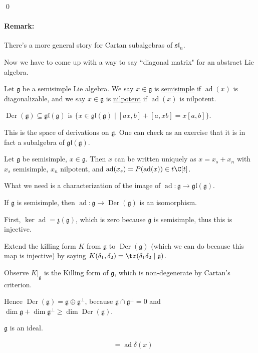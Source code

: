 \documentclass[x11names,reqno,14pt]{extarticle}
\newcommand{\mk}[1]{\mathfrak{#1}}
\newcommand{\g}{\mk{g}}
\DeclareMathOperator{\ad}{ad}
\DeclareMathOperator{\Der}{Der}
\newcommand{\gl}{\mk{g}\mk{l}}
\renewcommand{\sl}{\mk{s}\mk{l}}
\begin{document}
\qed

\paragraph{Remark:} There's a more general story for Cartan subalgebras of $\sl_n$. 

Now we have to come up with a way to say ``diagonal matrix" for an abstract Lie algebra. 


Let $\g$ be a semisimple Lie algebra. We say $x \in \g$ is \underline{semisimple} if $\ad(x)$ is diagonalizable, and we say $x \in \g$ is \underline{nilpotent} if $\ad(x)$ is nilpotent. 


$\Der(\g) \subseteq \gl(\g)$ is $\{x\in\gl(\g) \mid [ax, b] + [a, xb] = x[a,b]\}$.

This is the space of derivations on $\g$. One can check as an exercise that it is in fact a subalgebra of $\gl(\g)$. 

\thm

Let $\g$ be semisimple, $x \in \g$. Then $x$ can be written uniquely as $x = x_s + x_n$ with $x_s$ semisimple, $x_n$ nilpotent, and $\ad(x_s) = P(\ad(x)) \in t\C[t]$. 

\proof

What we need is a characterization of the image of $\ad:\g\to\gl(\g)$.

\prop

If $\g$ is semisimple, then $\ad:\g\to\Der(\g)$ is an isomorphism. 

\proof

First, $\ker\ad = \mk{z}(\g)$, which is zero because $\g$ is semisimple, thus this is injective. 

Extend the killing form $K$ from $\g$ to $\Der(\g)$ (which we can do because this map is injective) by saying $K(\delta_1,\delta_2) = \tr(\delta_1\delta_2\mid \g)$. 

Observe $K|_\g$ is the Killing form of $\g$, which is non-degenerate by Cartan's criterion. 

Hence $\Der(\g) = \g \oplus \g^\perp$, because $\g \cap \g^\perp = 0$ and $\dim \g + \dim \g^\perp \geq \dim \Der(\g)$. 

\claim

$\g$ is an ideal. 

\proof

\begin{align*}
[\delta,\ad(x)] & = \ad\delta(x) \\
\end{align*}
\end{document}
